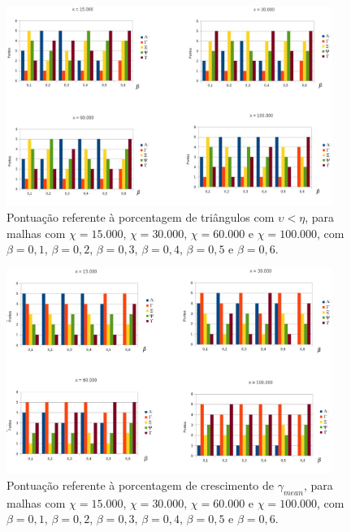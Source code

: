 \begin{figure}[!ht]
  \centering
  \includegraphics[width=300pt]{imagens_resultados/per_upsilon.png}
  \caption{\footnotesize{Pontuação referente à porcentagem de triângulos com $\upsilon < \eta$, para malhas com $\chi = 15.000$, $\chi = 30.000$, $\chi = 60.000$ e $\chi = 100.000$, com $\beta = 0,1$, $\beta = 0,2$, $\beta = 0,3$, $\beta = 0,4$, $\beta = 0,5$ e $\beta = 0,6$.
   \label{grafico_per_upsilon}
}}
\end{figure}

\begin{figure}[!ht]
  \centering
  \includegraphics[width=300pt]{imagens_resultados/cresc_gamma.png}
  \caption{\footnotesize{Pontuação referente à porcentagem de crescimento de $\gamma_{mean}$, para malhas com $\chi = 15.000$, $\chi = 30.000$, $\chi = 60.000$ e $\chi = 100.000$, com $\beta = 0,1$, $\beta = 0,2$, $\beta = 0,3$, $\beta = 0,4$, $\beta = 0,5$ e $\beta = 0,6$.
   \label{grafico_cresc_gamma}
}}
\end{figure}